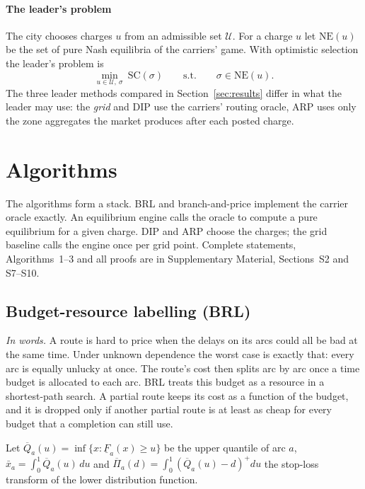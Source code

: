 \documentclass[preprint,11pt]{elsarticle}
\theoremstyle{definition}
\theoremstyle{remark}
\newcommand{\Qb}{\overline{Q}}
\newcommand{\Fl}{\underline{F}}
\newcommand{\Pib}{\overline{\Pi}}
\newcommand{\xb}{\bar x}
\newcommand{\pos}[1]{\left(#1\right)^{+}}
\newcommand{\SMs}[1]{Supplementary Material, Sections~#1}
\begin{document}
\paragraph{The leader's problem} The city chooses charges $u$ from an admissible set $\mathcal U$. For a charge $u$ let $\mathrm{NE}(u)$ be the set of pure Nash equilibria of the carriers' game. With optimistic selection the leader's problem is
\begin{equation}\label{eq:bilevel}
\min_{u\in\mathcal U,\ \sigma}\ \mathrm{SC}(\sigma)\qquad\text{s.t.}\qquad\sigma\in\mathrm{NE}(u).
\end{equation}
The three leader methods compared in Section~\ref{sec:results} differ in what the leader may use: the \emph{grid} and DIP use the carriers' routing oracle, ARP uses only the zone aggregates the market produces after each posted charge.

\section{Algorithms}\label{sec:algo}

The algorithms form a stack. BRL and branch-and-price implement the carrier oracle exactly. An equilibrium engine calls the oracle to compute a pure equilibrium for a given charge. DIP and ARP choose the charges; the grid baseline calls the engine once per grid point. Complete statements, Algorithms~1--3 and all proofs are in \SMs{S2 and S7--S10}.

\subsection{Budget-resource labelling (BRL)}\label{sec:brl}

\emph{In words.} A route is hard to price when the delays on its arcs could all be bad at the same time. Under unknown dependence the worst case is exactly that: every arc is equally unlucky at once. The route's cost then splits arc by arc once a time budget is allocated to each arc. BRL treats this budget as a resource in a shortest-path search. A partial route keeps its cost as a function of the budget, and it is dropped only if another partial route is at least as cheap for every budget that a completion can still use.

Let $\Qb_a(u)=\inf\{x:\Fl_a(x)\ge u\}$ be the upper quantile of arc $a$, $\xb_a=\int_0^1\Qb_a(u)\,du$ and $\Pib_a(d)=\int_0^1\pos{\Qb_a(u)-d}du$ the stop-loss transform of the lower distribution function.
\end{document}
